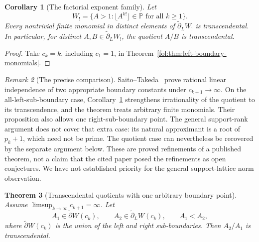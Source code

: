 \documentclass[11pt,a4paper]{article}
\newtheorem{theorem}{Theorem}[section]
\newtheorem{corollary}[theorem]{Corollary}
\theoremstyle{definition}
\theoremstyle{remark}
\newtheorem{remark}[theorem]{Remark}
\numberwithin{equation}{section}
\begin{document}
\begin{corollary}[The factorial exponent family]
\label{fol:cor:boundary-factorial}
Let
\[
 W_{!}=\{A>1:\lfloor A^{k!}\rfloor\in\mathbb P
                   \text{ for all }k\ge1\}.
\]
Every nontrivial finite monomial in distinct elements of
$\widetilde\partial_L W_{!}$ is transcendental. In particular, for
distinct $A,B\in\widetilde\partial_L W_{!}$, the quotient $A/B$ is
transcendental.
\end{corollary}
\begin{proof}
Take $c_k=k$, including $c_1=1$, in
Theorem~\ref{fol:thm:left-boundary-monomials}.
\end{proof}

\begin{remark}[The precise comparison]
Saito--Takeda~\cite[Proposition~8.2 and Corollary~8.3]{SaitoTakeda2022}
prove rational linear independence of two appropriate boundary
constants under $c_{k+1}\to\infty$. On the all-left-sub-boundary case,
Corollary~\ref{fol:cor:boundary-factorial} strengthens irrationality of the
quotient to its transcendence, and the theorem treats arbitrary finite
monomials. Their proposition also allows one right-sub-boundary point.
The general support-rank argument does not cover that extra case:
its natural approximant is a root of $p_k+1$, which need not be prime.
The quotient case can nevertheless be recovered by the separate
argument below. These are proved refinements of a published theorem,
not a claim that the cited paper posed the refinements as open
conjectures. We have not established priority for the general
support-lattice norm observation.
\end{remark}

\begin{theorem}[Transcendental quotients with one arbitrary boundary point]
\label{fol:thm:boundary-quotient}
Assume $\limsup_{k\to\infty}c_{k+1}=\infty$. Let
\[
 A_1\in\widetilde\partial W(c_k),\qquad
 A_2\in\widetilde\partial_L W(c_k),\qquad A_1<A_2,
\]
where $\widetilde\partial W(c_k)$ is the union of the left and right
sub-boundaries. Then $A_2/A_1$ is transcendental.
\end{theorem}
\end{document}
